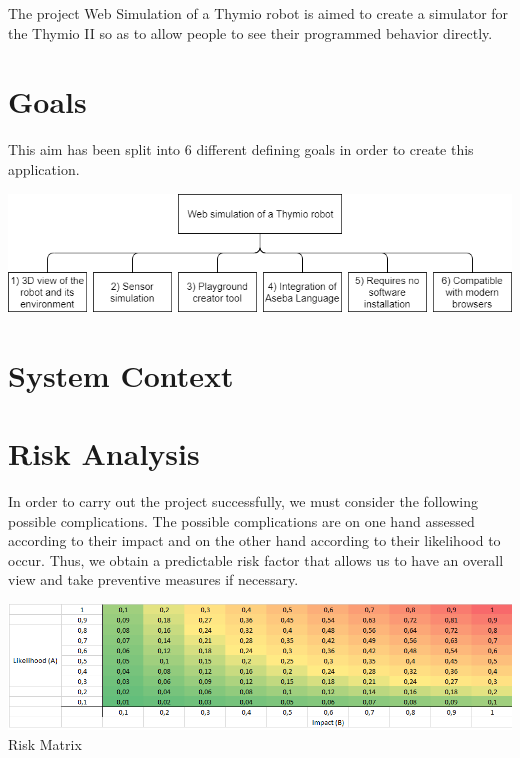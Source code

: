 \documentclass{scrbook}
\begin{document}
The project Web Simulation of a Thymio robot is aimed to create a simulator for the Thymio II so as to allow people to see their programmed behavior directly.

\section{Goals}

This aim has been split into 6 different defining goals in order to create this application.

\begin{center}
  \includegraphics[width=\textwidth]{./goals}
\end{center}

\section{System Context}
\section{Risk Analysis}
In order to carry out the project successfully, we must consider the following possible complications. The possible complications are on one hand assessed according to their impact and on the other hand according to their likelihood to occur. 
Thus, we obtain a predictable risk factor that allows us to have an overall view and take preventive measures if necessary.

\begin{center}
  \includegraphics[width=\textwidth]{./risk-matrix}\\
  Risk Matrix
\end{center}
\end{document}
